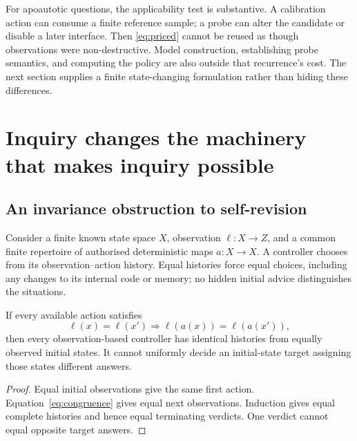 For apoautotic questions, the applicability test is substantive. A calibration action can consume a finite reference sample; a probe can alter the candidate or disable a later interface. Then \eqref{eq:priced} cannot be reused as though observations were non-destructive. Model construction, establishing probe semantics, and computing the policy are also outside that recurrence's cost. The next section supplies a finite state-changing formulation rather than hiding these differences.

\section{Inquiry changes the machinery that makes inquiry possible}
\label{sec:strategy}

\subsection{An invariance obstruction to self-revision}

Consider a finite known state space \(X\), observation \(\ell:X\to Z\), and a common finite repertoire of authorised deterministic maps \(a:X\to X\). A controller chooses from its observation--action history. Equal histories force equal choices, including any changes to its internal code or memory; no hidden initial advice distinguishes the situations.

\begin{proposition}
\label{prop:congruence}
If every available action satisfies
\begin{equation}
\ell(x)=\ell(x')\Longrightarrow\ell(a(x))=\ell(a(x')),
\label{eq:congruence}
\end{equation}
then every observation-based controller has identical histories from equally observed initial states. It cannot uniformly decide an initial-state target assigning those states different answers.
\end{proposition}
\begin{proof}
Equal initial observations give the same first action. Equation~\eqref{eq:congruence} gives equal next observations. Induction gives equal complete histories and hence equal terminating verdicts. One verdict cannot equal opposite target answers.
\end{proof}

